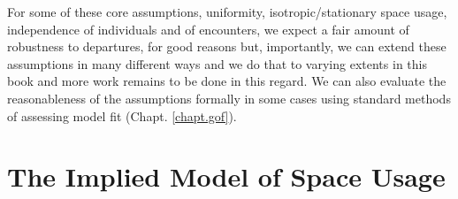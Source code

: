 For some of these core assumptions, uniformity, isotropic/stationary
space usage, independence of individuals and of encounters, we expect
a fair amount of robustness to departures, for good reasons but,
importantly, we can extend these assumptions in many different ways
and we do that to varying extents in this book and more work remains 
to be done in this regard. We can also evaluate the reasonableness of the assumptions
formally in some cases using standard methods of assessing model fit
(Chapt. \ref{chapt.gof}).

\section{The Implied Model of Space Usage}
\label{scr0.sec.implied}


